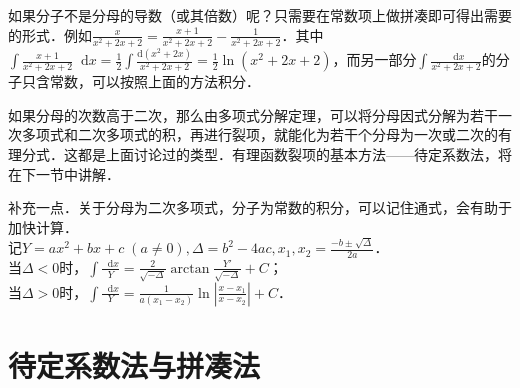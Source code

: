 \documentclass{ctexbook}
\newcommand*{\dif}{\mathop{}\!\mathrm{d}}
\begin{document}
如果分子不是分母的导数（或其倍数）呢？只需要在常数项上做拼凑即可得出需要的形式．例如$\frac{x}{x^{2}+2x+2}=\frac{x+1}{x^{2}+2x+2}-\frac{1}{x^{2}+2x+2}$．其中$\int\frac{x+1}{x^{2}+2x+2}\dif{x}=\frac{1}{2}\int\frac{\mathrm{d}\left(x^{2}+2x\right)}{x^{2}+2x+2}=\frac{1}{2}\ln{\left(x^{2}+2x+2\right)}$，而另一部分$\int\frac{\dif{x}}{x^{2}+2x+2}$的分子只含常数，可以按照上面的方法积分．\par
如果分母的次数高于二次，那么由多项式分解定理，可以将分母因式分解为若干一次多项式和二次多项式的积，再进行裂项，就能化为若干个分母为一次或二次的有理分式．这都是上面讨论过的类型．有理函数裂项的基本方法——待定系数法，将在下一节中讲解．\par
补充一点．关于分母为二次多项式，分子为常数的积分，可以记住通式，会有助于加快计算．\\
记$Y=ax^{2}+bx+c\;\left(a\ne0\right),\Delta=b^{2}-4ac,x_{1},x_{2}=\frac{-b\pm\sqrt{\Delta}}{2a}$．\\
当$\Delta<0$时，$\int\frac{\dif{x}}{Y}=\frac{2}{\sqrt{-\Delta}}\arctan{\frac{Y'}{\sqrt{-\Delta}}}+C$；\\
当$\Delta>0$时，$\int\frac{\dif{x}}{Y}=\frac{1}{a\left(x_{1}-x_{2}\right)}\ln{|\frac{x-x_{1}}{x-x_{2}}|}+C$．
\section{待定系数法与拼凑法}
\end{document}
